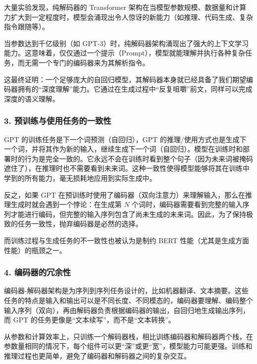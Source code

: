 大量实验发现，纯解码器的 Transformer 架构在当模型参数规模、数据量和计算力扩大到一定程度时，模型会涌现出令人惊讶的新能力（如推理、代码生成、复杂指令跟随等）。

当参数达到千亿级别（如 GPT-3）时，纯解码器架构涌现出了强大的上下文学习能力。这意味着，仅仅通过一个提示（Prompt），模型就能理解并执行各种复杂任务，而无需一个专门的编码器来为其解析指令。

这最终证明：一个足够庞大的自回归模型，其解码器本身就已经具备了我们期望编码器拥有的``深度理解''能力。它通过在生成过程中``反复咀嚼''前文，同样可以完成深度的语义理解。

\hypertarget{ux9884ux8badux7ec3ux4e0eux4f7fux7528ux4efbux52a1ux7684ux4e00ux81f4ux6027}{%
\subsubsection{3. 预训练与使用任务的一致性}\label{ux9884ux8badux7ec3ux4e0eux4f7fux7528ux4efbux52a1ux7684ux4e00ux81f4ux6027}}

GPT 的训练任务是下一个词预测（自回归），GPT 的推理/使用方式也是生成下一个词，并将其作为新的输入，继续生成下一个词（自回归）。模型在训练时和部署时的行为是完全一致的。它永远不会在训练时看到整个句子（因为未来词被掩码遮住了），在推理时也不需要看到未来词。这种一致性使得模型能够将其在训练中学到的所有能力，毫无损耗地应用到实际生成中。

反之，如果 GPT 在预训练时使用了编码器（双向注意力）来理解输入，那么在推理生成时就会遇到一个悖论：在生成第 \(N\) 个词时，编码器需要看到完整的输入序列才能进行编码，但完整的输入序列包含了尚未生成的未来词。因此，为了保持极致的任务一致性，抛弃编码器是必然的选择。

而训练过程与生成任务的不一致性也被认为是制约 BERT 性能（尤其是生成方面性能）的瓶颈之一。

\hypertarget{ux7f16ux7801ux5668ux7684ux5197ux4f59ux6027}{%
\subsubsection{4. 编码器的冗余性}\label{ux7f16ux7801ux5668ux7684ux5197ux4f59ux6027}}

编码器-解码器架构是为序列到序列任务设计的，比如机器翻译、文本摘要。这些任务的特点是输入和输出可以是不同长度、不同模态的，编码器要理解、编码整个输入序列（双向），再由解码器负责根据编码器的输出，自回归地生成输出序列，而 GPT 的任务更像是``文本续写''，而不是``文本转换''。

从参数和计算效率上，只训练一个解码器栈，相比训练编码器和解码器两个栈，在参数量相同的情况下，每个组件可以更``深''或更``宽''，模型能力可能更强。训练和推理过程也更简单，避免了编码器和解码器之间的复杂交互。


